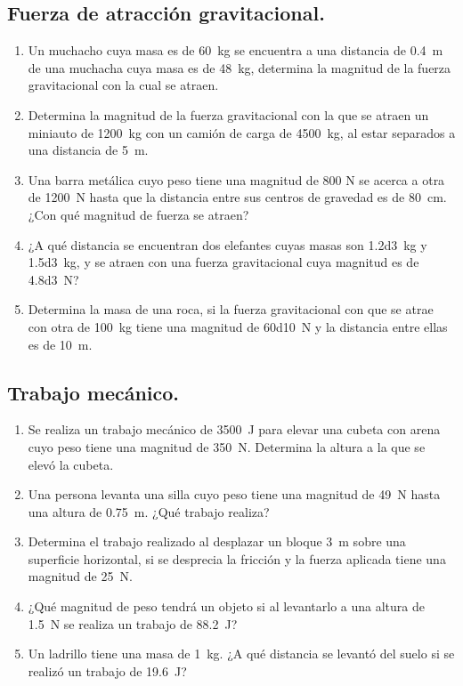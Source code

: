 \documentclass[14pt]{extarticle}
\begin{document}
\subsection{Fuerza de atracción gravitacional.}
\begin{enumerate}
\item Un muchacho cuya masa es de \SI{60}{\kilo\gram} se encuentra a una distancia de \SI{0.4}{\meter} de una muchacha cuya masa es de \SI{48}{\kilo\gram}, determina la magnitud de la fuerza gravitacional con la cual se atraen.
\item Determina la magnitud de la fuerza gravitacional con la que se atraen un miniauto de \SI{1200}{\kilo\gram} con un camión de carga de \SI{4500}{\kilo\gram}, al estar separados a una distancia de \SI{5}{\meter}.
\item Una barra metálica cuyo peso tiene una magnitud de 800 N se acerca a otra de \SI{1200}{\newton} hasta que la distancia entre sus centros de gravedad es de \SI{80}{\centi\meter}. ¿Con qué magnitud de fuerza se atraen?
\item ¿A qué distancia se encuentran dos elefantes cuyas masas son \SI{1.2d3}{\kilo\gram} y \SI{1.5d3}{\kilo\gram}, y se atraen con una fuerza gravitacional cuya magnitud es de \SI{4.8d3}{\newton}?
\item Determina la masa de una roca, si la fuerza gravitacional con que se atrae con otra de \SI{100}{\kilo\gram} tiene una magnitud de \SI{60d10}{\newton} y la distancia entre ellas es de \SI{10}{\meter}.
\end{enumerate}

\subsection{Trabajo mecánico.}

\begin{enumerate}
\item Se realiza un trabajo mecánico de \SI{3500}{\joule} para elevar una cubeta con arena cuyo peso tiene una magnitud de \SI{350}{\newton}. Determina la altura a la que se elevó la cubeta.
\item Una persona levanta una silla cuyo peso tiene una magnitud de \SI{49}{\newton} hasta una altura de \SI{0.75}{\meter}. ¿Qué trabajo realiza?
\item Determina el trabajo realizado al desplazar un bloque \SI{3}{\meter} sobre una superficie horizontal, si se desprecia la fricción y la fuerza aplicada tiene una magnitud de \SI{25}{\newton}.
\item ¿Qué magnitud de peso tendrá un objeto si al levantarlo a una altura de \SI{1.5}{\newton} se realiza un trabajo de \SI{88.2}{\joule}?
\item Un ladrillo tiene una masa de \SI{1}{\kilo\gram}. ¿A qué distancia se levantó del suelo si se realizó un trabajo de \SI{19.6}{\joule}?
\end{enumerate}
\end{document}
